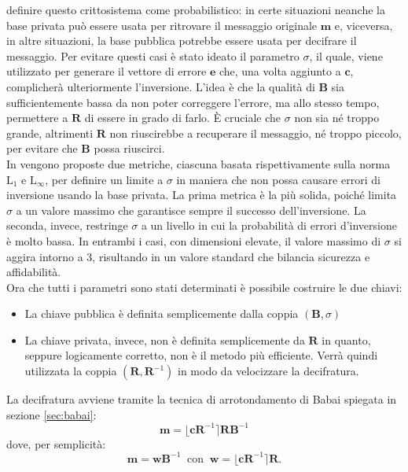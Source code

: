 definire questo crittosistema come probabilistico: in certe situazioni neanche la base
privata può essere usata per ritrovare il messaggio originale $\mathbf{m}$ e, viceversa, 
in altre situazioni, la base pubblica potrebbe essere usata per decifrare il messaggio. 
Per evitare questi casi è stato ideato il parametro $\sigma$, il 
quale, viene utilizzato per generare il vettore di errore $\mathbf{e}$ che, una volta 
aggiunto a $\mathbf{c}$, complicherà ulteriormente l'inversione. L'idea è che la
qualità di $\mathbf{B}$ sia sufficientemente bassa da non poter correggere l'errore,
ma allo stesso tempo, permettere a $\mathbf{R}$ di essere in grado di farlo. 
È cruciale che $\sigma$ non sia né troppo grande, altrimenti $\mathbf{R}$ non riuscirebbe 
a recuperare il messaggio, né troppo piccolo, per evitare che $\mathbf{B}$ possa riuscirci.
\\
In \cite[Sezione 3.2]{GGH97} vengono proposte due metriche, ciascuna basata rispettivamente
sulla norma $\text{L}_1$ e $\text{L}_\infty$, per definire un limite a
$\sigma$ in maniera che non possa causare errori di inversione usando la base privata.
La prima metrica è la più solida, poiché limita $\sigma$ a un valore massimo che garantisce 
sempre il successo dell'inversione. La seconda, invece, restringe $\sigma$ a un livello 
in cui la probabilità di errori d'inversione è molto bassa. In entrambi i casi, con 
dimensioni elevate, il valore massimo di $\sigma$ si aggira intorno a 3, risultando in un 
valore standard che bilancia sicurezza e affidabilità.
\\
Ora che tutti i parametri sono stati determinati è possibile costruire le due chiavi:
\begin{itemize}
    \item La chiave pubblica è definita semplicemente dalla coppia $(\mathbf{B}, \sigma)$
    \item La chiave privata, invece, non è definita semplicemente da $\mathbf{R}$ in quanto,
    seppure logicamente corretto, non è il metodo più efficiente. Verrà quindi utilizzata
    la coppia $(\mathbf{R},\mathbf{R}^{-1})$
    in modo da velocizzare la decifratura.
\end{itemize}
La decifratura avviene tramite la tecnica di arrotondamento di Babai spiegata in sezione 
\ref{sec:babai}:
\[
    \mathbf{m} =  \lfloor \mathbf{c}\mathbf{R}^{-1}\rceil \mathbf{R} \mathbf{B}^{-1}
\]
dove, per semplicità:
\[
    \mathbf{m} = \mathbf{w}\mathbf{B}^{-1}
    \ \text{ con } \ \mathbf{w} = \lfloor\mathbf{c}\mathbf{R}^{-1}\rceil\mathbf{R}.
\]
